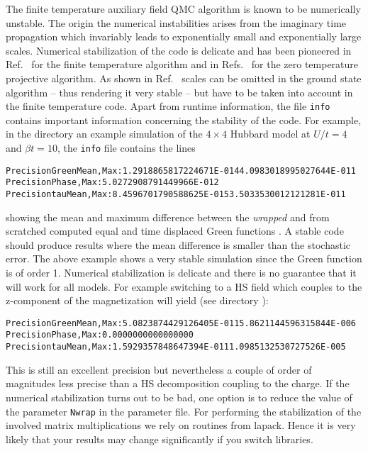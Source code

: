 The finite temperature  auxiliary field QMC algorithm is known to be numerically  unstable. 
The origin the numerical instabilities arises  from the imaginary time propagation which invariably leads to exponentially small and exponentially large scales.
Numerical stabilization of the code is delicate and has been pioneered in Ref.~\cite{White89}  for the finite temperature algorithm and in Refs.~\cite{Sugiyama86,Sorella89} for the zero  temperature projective algorithm.
As shown in Ref.~\cite{Assaad08_rev}  scales can be omitted in the ground state algorithm -- thus rendering it very stable --  but have to be taken into account in the  finite temperature code. Apart from runtime information, the file \texttt{info} contains important information concerning the stability of the code.
For example, in the directory  an example simulation of the $4 \times 4$ Hubbard model at $U/t=4$ and $\beta t = 10$, the \texttt{info} file contains the lines
\begin{alltt}
Precision Green  Mean, Max :    1.2918865817224671E-014   4.0983018995027644E-011
Precision Phase, Max       :    5.0272908791449966E-012
Precision tau    Mean, Max :    8.4596701790588625E-015   3.5033530012121281E-011
\end{alltt}
showing the mean and maximum difference between the {\it  wrapped }  and from scratched computed equal and time displaced  Green functions \cite{Assaad08_rev}.
A stable code  should produce results where the mean difference is smaller than the  stochastic error. The above example  shows a very stable  simulation since the Green function  is of order 1. Numerical stabilization is delicate and there is no guarantee  that it will work for all models.
For example switching to a HS field which couples to the z-component of the magnetization will yield (see directory ):
 \begin{alltt}
Precision Green  Mean, Max :    5.0823874429126405E-011   5.8621144596315844E-006
Precision Phase, Max       :    0.0000000000000000     
Precision tau    Mean, Max :    1.5929357848647394E-011   1.0985132530727526E-005 
\end{alltt}
This is still an excellent precision but nevertheless a couple of order of magnitudes less precise than a HS decomposition coupling to the charge. 
If the numerical stabilization turns out to be bad, one option is to reduce the  value of the parameter \texttt{Nwrap} in the parameter file. 
For performing the stabilization of the involved matrix multiplications we rely on routines from lapack. Hence it is very likely that your results may change significantly if you switch libraries.
